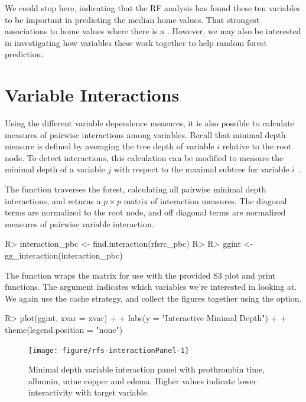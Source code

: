 \documentclass[nojss]{jss}\usepackage[]{graphicx}\usepackage[]{color}
\begin{document}
We could stop here, indicating that the RF analysis has found these ten variables to be important in predicting the median home values. That strongest associations to home values where there is a . However, we may also be interested in investigating how variables these work together to help random forest prediction.


\section{Variable Interactions}\label{S:interactions}

Using the different variable dependence measures, it is also possible to calculate measures of pairwise interactions among variables. Recall that minimal depth measure is defined by averaging the tree depth of variable $i$ relative to the root node. To detect interactions, this calculation can be modified to measure the minimal depth of a variable $j$ with respect to the maximal subtree for variable $i$~\citep{Ishwaran:2010,Ishwaran:2011}.

The  function traverses the forest, calculating all pairwise minimal depth interactions, and returns a $p \times p$ matrix of interaction measures. The diagonal terms are normalized to the root node, and off diagonal terms are normalized measures of pairwise variable interaction. 

\begin{Schunk}
\begin{Sinput}
R> interaction_pbc <- find.interaction(rfsrc_pbc)
R> 
R> ggint <- gg_interaction(interaction_pbc)
\end{Sinput}
\end{Schunk}



The  function wraps the  matrix for use with the provided S3 plot and print functions. The  argument indicates which variables we're interested in looking at. We again use the cache strategy, and collect the figures together using the  option.

\begin{Schunk}
\begin{Sinput}
R> plot(ggint, xvar = xvar) + 
+   labs(y = "Interactive Minimal Depth") + 
+   theme(legend.position = "none")
\end{Sinput}
\begin{figure}[!htpb]

{\centering \texttt{[image: figure/rfs-interactionPanel-1]} 

}

\caption[Minimal depth variable interaction panel with prothrombin time, albumin, urine copper and edema]{Minimal depth variable interaction panel with prothrombin time, albumin, urine copper and edema. Higher values indicate lower interactivity with target variable.\label{fig:interactionPanel}}
\end{figure}
\end{Schunk}
\end{document}
